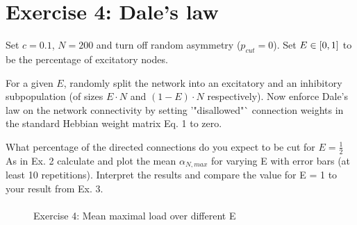 \section{Exercise 4: Dale's law}

\begin{itshape}
\small
Set $c=0.1$, $N = 200$ and turn off random asymmetry ($p_{cut} = 0$). Set $E \in \left[0, 1\right]$ to be the percentage of excitatory nodes.

For a given $E$, randomly split the network into an excitatory and an inhibitory subpopulation (of sizes $E \cdot N$ and $(1 - E) \cdot N$ respectively). Now enforce Dale's law on the network connectivity by setting '"disallowed"` connection weights in the standard Hebbian weight matrix Eq. 1 to zero.

What percentage of the directed connections do you expect to be cut for $E = \frac{1}{2}$
As in Ex. 2 calculate and plot the mean $\alpha_{N,max}$ for varying E with error bars (at least 10 repetitions). Interpret the results and compare the value for E = 1 to your result from Ex. 3.
\end{itshape}

\paragraph*{}

\begin{wrapfigure}{r}{0.5\textwidth}
  \vspace{-20pt}
  \begin{center}
  \end{center}
  \vspace{-20pt}
  \caption{Exercise 4: Mean maximal load over different E}
  \label{fig: Question 1.3}
  \vspace{-10pt}
\end{wrapfigure}


